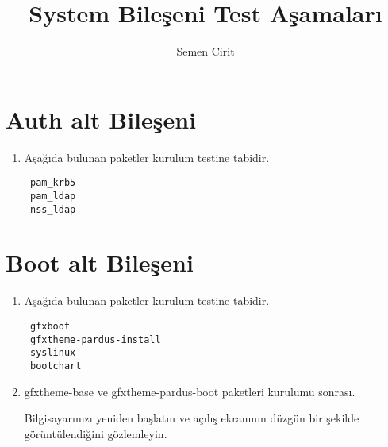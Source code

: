 \documentclass[a4paper,10pt]{article}
\title{System Bileşeni Test Aşamaları}
\author{Semen Cirit}
\begin{document}
\maketitle
\section{Auth alt Bileşeni}
\begin{enumerate}
  \item Aşağıda bulunan paketler kurulum testine tabidir.
\begin{verbatim}
 pam_krb5
 pam_ldap
 nss_ldap
\end{verbatim}

\end{enumerate}

\section{Boot alt Bileşeni}
\begin{enumerate}
 \item Aşağıda bulunan paketler kurulum testine tabidir.
\begin{verbatim}
 gfxboot
 gfxtheme-pardus-install
 syslinux
 bootchart
\end{verbatim}

\item gfxtheme-base ve gfxtheme-pardus-boot paketleri kurulumu sonrası.

Bilgisayarınızı yeniden başlatın ve açılış ekranının düzgün bir şekilde görüntülendiğini gözlemleyin.
\end{enumerate}
\end{document}
